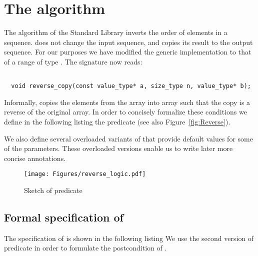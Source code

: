 
\section{The \reversecopy algorithm}

The \reversecopy
algorithm of the \cxx Standard Library \cite[\S 28.6.10]{cxx-17-draft} inverts the order of elements
in a sequence.
\reversecopy does not change the input sequence, and
copies its result to the output sequence.
For our purposes we have modified the generic implementation
to that of a range of type .
The signature now reads:

\begin{lstlisting}[style=acsl-block]

  void reverse_copy(const value_type* a, size_type n, value_type* b);
\end{lstlisting}


Informally, \reversecopy copies the elements from the array  into
array  such that the copy is a reverse of the original array. 
In order to concisely formalize these conditions we define in the following
listing the predicate  (see also Figure~\ref{fig:Reverse}).



We also define several overloaded variants of \Reverse that 
provide default values for some of the parameters.
These overloaded versions enable us to write later more concise \acsl annotations.

\begin{figure}[hbt]
\centering
\texttt{[image: Figures/reverse\_logic.pdf]}
\caption{ Sketch of predicate~\Reverse}
\end{figure}

\FloatBarrier

\subsection{Formal specification of \reversecopy}

The specification of  is shown in the following listing
We use the second version of predicate 
in order to formulate the postcondition of \reversecopy.

